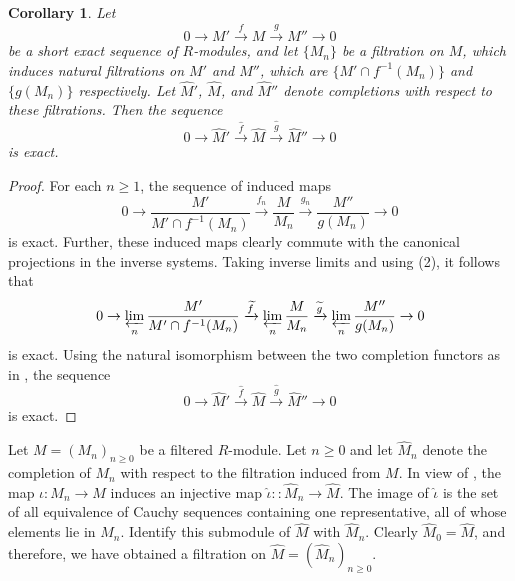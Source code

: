 \documentclass[11pt]{article}
\theoremstyle{thmstyle}
\theoremstyle{defstyle}
\newtheorem{corollary}[theorem]{Corollary}
\newcommand{\wt}[1]{\widetilde{#1}}
\newcommand{\wh}[1]{\widehat{#1}}
\renewcommand{\ge}{\geqslant}
\begin{document}
\begin{corollary}
    Let 
    \begin{equation*}
        0\to M'\xrightarrow{f} M\xrightarrow{g} M''\to 0
    \end{equation*}
    be a short exact sequence of $R$-modules, and let $\{M_n\}$ be a filtration on $M$, which induces natural filtrations on $M'$ and $M''$, which are $\{M'\cap f^{-1}(M_n)\}$ and $\{g(M_n)\}$ respectively. Let $\wh M'$, $\wh M$, and $\wh M''$ denote completions with respect to these filtrations. Then the sequence 
    \begin{equation*}
        0\to \wh M'\xrightarrow{\wh f}\wh M\xrightarrow{\wh g}\wh M''\to 0
    \end{equation*}
    is exact.
\end{corollary}
\begin{proof}
    For each $n\ge 1$, the sequence of induced maps 
    \begin{equation*}
        0\to\frac{M'}{M'\cap f^{-1}(M_n)}\xrightarrow{f_n}\frac{M}{M_n}\xrightarrow{g_n}\frac{M''}{g(M_n)}\to 0
    \end{equation*}
    is exact. Further, these induced maps clearly commute with the canonical projections in the inverse systems. Taking inverse limits and using  (2), it follows that 
    \begin{equation*}
        0\to\varprojlim_n \frac{M'}{M'\cap f^{-1}(M_n)}\xrightarrow{\wt f}\varprojlim_n\frac{M}{M_n}\xrightarrow{\wt g}\varprojlim_n\frac{M''}{g(M_n)}\to 0
    \end{equation*}
    is exact. Using the natural isomorphism between the two completion functors as in , the sequence 
    \begin{equation*}
        0\to \wh M'\xrightarrow{\wh f}\wh M\xrightarrow{\wh g}\wh M''\to 0
    \end{equation*}
    is exact.
\end{proof}

Let $M = (M_n)_{n\ge 0}$ be a filtered $R$-module. Let $n\ge 0$ and let $\wh M_n$ denote the completion of $M_n$ with respect to the filtration induced from $M$. In view of , the map $\iota\colon M_n\to M$ induces an injective map $\wh\iota\colon\colon\wh M_n\to \wh M$. The image of $\wh \iota$ is the set of all equivalence of Cauchy sequences containing one representative, all of whose elements lie in $M_n$. Identify this submodule of $\wh M$ with $\wh M_n$. Clearly $\wh M_0 = \wh M$, and therefore, we have obtained a filtration on $\wh M = (\wh M_n)_{n\ge 0}$. 
\end{document}
